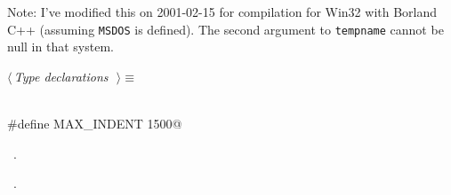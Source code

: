 \documentclass{report}
\begin{document}
Note: I've modified this on 2001-02-15 for compilation
for Win32 with Borland C++ (assuming \verb|MSDOS| is defined). The second
argument to \verb|tempname| cannot be null in that system.
\begin{flushleft} \small
\begin{minipage}{\linewidth} \label{scrap131}
$\langle\,${\it Type declarations}\nobreak\ {\footnotesize {}}$\,\rangle\equiv$
\vspace{-1ex}
\begin{list}{}{} \item
\mbox{}\verb@@\\
\mbox{}\verb@#define MAX_INDENT 1500@\\
\mbox{}\verb@@{\NWsep}
\end{list}
\vspace{-1ex}
\footnotesize\addtolength{\baselineskip}{-1ex}
\begin{list}{}{\setlength{\itemsep}{-\parsep}\setlength{\itemindent}{-\leftmargin}}
\item \NWtxtMacroDefBy\ .
\item \NWtxtMacroRefIn\ .
\end{list}
\end{minipage}\\[4ex]
\end{flushleft}
\end{document}
